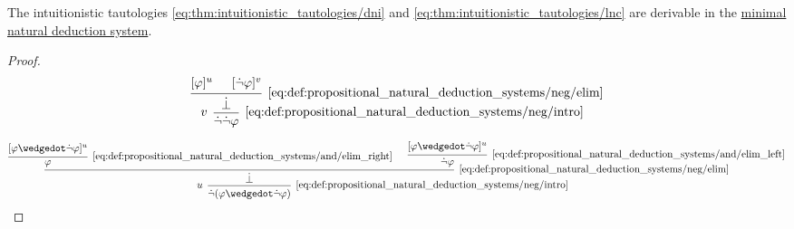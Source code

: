 \begin{proposition}\label{thm:syntactic_minimal_tautologies}
  The intuitionistic tautologies \eqref{eq:thm:intuitionistic_tautologies/dni} and \eqref{eq:thm:intuitionistic_tautologies/lnc} are derivable in the \hyperref[def:propositional_natural_deduction_systems]{minimal natural deduction system}.
\end{proposition}
\begin{proof}
  \begin{equation*}
    \begin{prooftree}
      \hypo{ [\varphi]^u }
      \hypo{ [\synneg \varphi]^v }
      \infer2[\ref{eq:def:propositional_natural_deduction_systems/neg/elim}]{ \synbot }
      \infer[left label=\( v \)]1[\ref{eq:def:propositional_natural_deduction_systems/neg/intro}]{ \synneg \synneg \varphi }
    \end{prooftree}
  \end{equation*}

  \begin{equation*}
    \begin{prooftree}
      \hypo{ [\varphi \synwedge \synneg \varphi]^u }
      \infer1[\ref{eq:def:propositional_natural_deduction_systems/and/elim_right}]{ \varphi }

      \hypo{ [\varphi \synwedge \synneg \varphi]^u }
      \infer1[\ref{eq:def:propositional_natural_deduction_systems/and/elim_left}]{ \synneg \varphi }

      \infer2[\ref{eq:def:propositional_natural_deduction_systems/neg/elim}]{ \synbot }

      \infer[left label=\( u \)]1[\ref{eq:def:propositional_natural_deduction_systems/neg/intro}]{ \synneg (\varphi \synwedge \synneg \varphi) }
    \end{prooftree}
  \end{equation*}
\end{proof}

